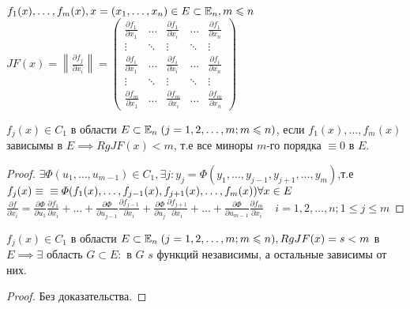 \documentclass[../main.tex]{subfiles}
\begin{document}
$f_{1}(x),\dots,f_{m}(x),x=(x_{1},\dots,x_{n})\in E\subset \mathbb{E}_{n}, m\leqslant n$\\ 
$JF(x) = \left\| \frac{\partial{f_{j}}}{\partial{x_{i}}} \right\| = \begin{pmatrix}
    \frac{\partial{f_{1}}}{\partial{x_{1}}} & \dots & \frac{\partial{f_{1}}}{\partial{x_{i}}} & \dots & \frac{\partial{f_{1}}}{\partial{x_{n}}} \\
    \vdots & \ddots & \vdots & \ddots & \vdots \\
    \frac{\partial{f_{i}}}{\partial{x_{1}}} & \dots & \frac{\partial{f_{i}}}{\partial{x_{i}}} & \dots & \frac{\partial{f_{i}}}{\partial{x_{n}}} \\
    \vdots & \ddots & \vdots & \ddots & \vdots \\
    \frac{\partial{f_{m}}}{\partial{x_{1}}} & \dots & \frac{\partial{f_{m}}}{\partial{x_{i}}} & \dots & \frac{\partial{f_{m}}}{\partial{x_{n}}}
\end{pmatrix}$
\vspace{0.5cm} 
\begin{theorem}
    $f_{j}(x) \in C_{1}$ в области $E\subset \mathbb{E}_{n} \; (j=1,2,\dots,m; m\leqslant n)$, если $f_{1}(x),\dots,f_{m}(x)$ зависымы в $E \implies RgJF(x)<m$, т.е все миноры $m$-го порядка $\equiv 0 $ в $E$.
\end{theorem}

\begin{proof}
$\exists \varPhi(u_{1},\dots,u_{m-1})\in C_{1}, \exists j : y_{j}= \varPhi(y_{1},\dots,y_{j-1},y_{j+1},\dots,y_{m})$,т.е $f_{j}(x)\equiv \\ \equiv \varPhi(f_{1}(x),\dots,f_{j-1}(x),f_{j+1}(x),\dots,f_{m}(x)) \forall x \in E$ \\ 
$\frac{\partial{f}}{\partial{x_{i}}} = \frac{\partial{\varPhi}}{\partial{u_{1}}}\frac{\partial{f_{1}}}{\partial{x_{i}}} + \dots + \frac{\partial{\varPhi}}{\partial{u_{j-1}}}\frac{\partial{f_{j-1}}}{\partial{x_{i}}} + \frac{\partial{\varPhi}}{\partial{u_{j}}}\frac{\partial{f_{j+1}}}{\partial{x_{i}}} + \dots + \frac{\partial{\varPhi}}{\partial{u_{m-1}}}\frac{\partial{f_{m}}}{\partial{x_{i}}} \quad i=1,2,\dots, n; 1 \leqslant j \leqslant m $
\end{proof}
\newpage
\begin{theorem}
    $f_{j}(x)\in C_{1}$ в области $E\subset \mathbb{E}_{n} \; (j=1,2,\dots,m;\\ m\leqslant n), RgJF(x)= s < m $ в $E\implies \exists$ область $G\subset E : $ в $G$ $s$ функций независимы, а остальные зависимы от них.  
\end{theorem}
\begin{proof}
    Без доказательства.
\end{proof}
\end{document}

